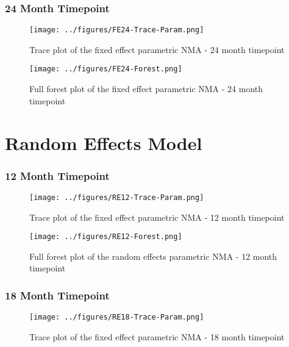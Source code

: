 \subsubsection{24 Month Timepoint}

\begin{figure}[h]
    \center
    \texttt{[image: ../figures/FE24-Trace-Param.png]}
    \caption{Trace plot of the fixed effect parametric NMA - 24 month timepoint}
    \label{fig:fe18_trace_param}
\end{figure}

\begin{figure}[h]
    \center
    \texttt{[image: ../figures/FE24-Forest.png]}
    \caption{Full forest plot of the fixed effect parametric NMA - 24 month timepoint}
    \label{fig:fe18_full_forest}
\end{figure}

\section{Random Effects Model}

\subsubsection{12 Month Timepoint}

\begin{figure}[h]
    \center
    \texttt{[image: ../figures/RE12-Trace-Param.png]}
    \caption{Trace plot of the fixed effect parametric NMA - 12 month timepoint}
    \label{fig:fe_trace_param}
\end{figure}

\begin{figure}[h]
    \center
    \texttt{[image: ../figures/RE12-Forest.png]}
    \caption{Full forest plot of the random effects parametric NMA - 12 month timepoint}
    \label{fig:re_full_forest}
\end{figure}

\subsubsection{18 Month Timepoint}

\begin{figure}[h]
    \center
    \texttt{[image: ../figures/RE18-Trace-Param.png]}
    \caption{Trace plot of the fixed effect parametric NMA - 18 month timepoint}
    \label{fig:fe_trace_param}
\end{figure}

